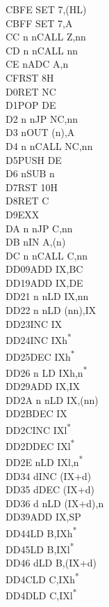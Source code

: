 \documentclass[twoside,openright,a4paper]{book}
\begin{document}
\begin{multicols}{3}
{\begin{tabbing}
	CBFE\> 	SET 7,(HL)\\
	CBFF\> 	SET 7,A\\
	CC n n\>CALL Z,nn\\
	CD n n\>CALL nn\\
	CE n\>ADC A,n\\
	CF\>RST 8H\\
	D0\>RET NC\\
	D1\>POP DE\\
	D2 n n\>JP NC,nn\\
	D3 n\>OUT (n),A\\
	D4 n n\>CALL NC,nn\\
	D5\>PUSH DE\\
	D6 n\>SUB n\\
	D7\>RST 10H\\
	D8\>RET C\\
	D9\>EXX\\
	DA n n\>JP C,nn\\
	DB n\>IN A,(n)\\
	DC n n\>CALL C,nn\\
	DD09\>ADD IX,BC\\
	DD19\>ADD IX,DE\\
	DD21 n n\>LD IX,nn\\
	DD22 n n\>LD (nn),IX\\
	DD23\>INC IX\\
	DD24\>INC IXh\textsuperscript{*}\\
	DD25\>DEC IXh\textsuperscript{*}\\
	DD26 n \>LD IXh,n\textsuperscript{*}\\
	DD29\>ADD IX,IX\\
	DD2A n n\>LD IX,(nn)\\
	DD2B\>DEC IX\\
	DD2C\>INC IXl\textsuperscript{*}\\
	DD2D\>DEC IXl\textsuperscript{*}\\
	DD2E n\>LD IXl,n\textsuperscript{*}\\
	DD34 d\>INC (IX+d)\\
	DD35 d\>DEC (IX+d)\\
	DD36 d n\>LD (IX+d),n\\
	DD39\>ADD IX,SP\\
	DD44\>LD B,IXh\textsuperscript{*}\\
	DD45\>LD B,IXl\textsuperscript{*}\\
	DD46 d\>LD B,(IX+d)\\
	DD4C\>LD C,IXh\textsuperscript{*}\\
	DD4D\>LD C,IXl\textsuperscript{*}\\

\end{tabbing}}
\end{multicols}
\end{document}
